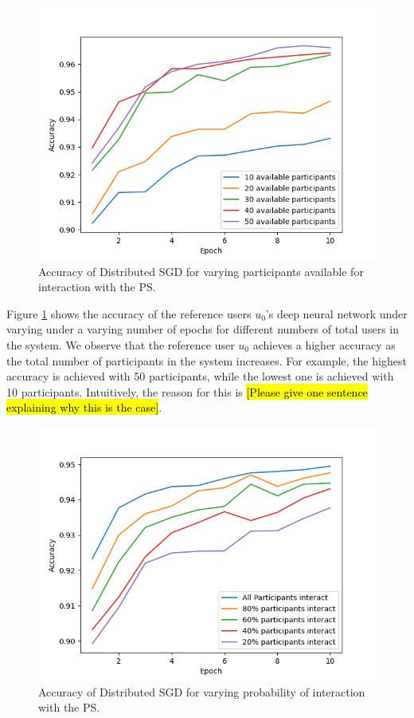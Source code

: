 \documentclass[conference]{IEEEtran}
\begin{document}
\begin{figure}[!h]
\centering
\includegraphics[width=\columnwidth, keepaspectratio]{VaryingPoolofParticipants}
\caption{Accuracy of Distributed SGD for varying participants available for interaction with the PS.}
\label{fig:VaryingPoolofParticipants}
\end{figure}

Figure \ref{fig:VaryingPoolofParticipants} shows the accuracy of the reference users $u_0$'s deep neural network under varying
under a varying number of epochs for different numbers of total users in the system. We observe that 
the reference user $u_0$ achieves a higher accuracy as the total number of participants in the system increases. For example, the
highest accuracy is achieved with 50 participants, while the lowest one is achieved with 10 participants. Intuitively, the reason for
this is \hl{[Please give one sentence explaining why this is the case]}. 

\begin{figure}[!h]
\centering
\includegraphics[width=\columnwidth, keepaspectratio]{VaryingProbabilityInteraction}
\caption{Accuracy of Distributed SGD for varying probability of interaction with the PS. }
\label{fig:VaryingProbabilityInteraction}
\end{figure}
\end{document}
